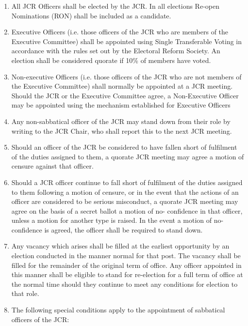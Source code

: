 \begin{enumerate}
    \item All JCR Officers shall be elected by the JCR. In all elections Re-open Nominations (RON) shall be included as a candidate.
    \item  Executive Officers (i.e. those officers of the JCR who are members of the Executive Committee) shall be appointed using Single Transferable Voting in accordance with the rules set out by the Electoral Reform Society.
    An election shall be considered quorate if 10\% of members have voted.
    \item  Non-executive Officers (i.e. those officers of the JCR who are not members of the Executive Committee) shall normally be appointed at a JCR meeting. Should the JCR or the Executive Committee agree, a Non-Executive Officer may be appointed using the mechanism established for Executive Officers
    \item  Any non-sabbatical officer of the JCR may stand down from their role by writing to the JCR Chair, who shall report this to the next JCR meeting.
    \item  Should an officer of the JCR be considered to have fallen short of fulfilment of the duties assigned to them, a quorate JCR meeting may agree a motion of censure against that officer.
    \item  Should a JCR officer continue to fall short of fulfilment of the duties assigned to them following a motion of censure, or in the event that the actions of an officer are considered to be serious misconduct, a quorate JCR meeting may agree on the basis of a secret ballot a motion of no- confidence in that officer, unless a motion for another type is raised. In the event a motion of no- confidence is agreed, the officer shall be required to stand down.
    \item  Any vacancy which arises shall be filled at the earliest opportunity by an election conducted in the manner normal for that post. The vacancy shall be filled for the remainder of the original term of office. Any officer appointed in this manner shall be eligible to stand for re-election for a full term of office at the normal time should they continue to meet any conditions for election to that role.
    \item  The following special conditions apply to the appointment of sabbatical officers of the JCR:
    \begin{enumerate}

\end{enumerate}
\end{enumerate}
